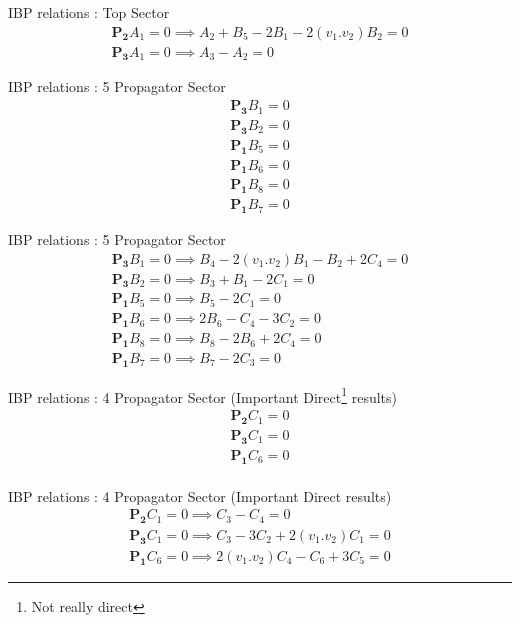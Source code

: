 \documentclass[11pt]{beamer}
\begin{document}
\begin{frame}
	IBP relations : Top Sector
	\begin{align}
		\boldsymbol{P_2}A_1=0 \implies A_2+B_5-2B_1-2(v_1.v_2)B_2=0\\	
		\boldsymbol{P_3}A_1=0 \implies A_3-A_2=0
	\end{align}
\end{frame}
\begin{frame}
	IBP relations : 5 Propagator Sector
	\begin{align*}
		\boldsymbol{P_3}B_1=0 \\	
		\boldsymbol{P_3}B_2=0 \\
		\boldsymbol{P_1}B_5=0 \\
		\boldsymbol{P_1}B_6=0 \\
		\boldsymbol{P_1}B_8=0 \\
		\boldsymbol{P_1}B_7=0 
	\end{align*}
\end{frame}
\begin{frame}
	IBP relations : 5 Propagator Sector
	\begin{align}
		\boldsymbol{P_3}B_1=0 \implies B_4-2(v_1.v_2)B_1-B_2+2C_4=0\\	
		\boldsymbol{P_3}B_2=0 \implies B_3+B_1-2C_1=0\\
		\boldsymbol{P_1}B_5=0 \implies B_5-2C_1=0\\
		\boldsymbol{P_1}B_6=0 \implies 2B_6-C_4-3C_2=0\\
		\boldsymbol{P_1}B_8=0 \implies B_8-2B_6+2C_4=0\\
		\boldsymbol{P_1}B_7=0 \implies B_7-2C_3=0 
	\end{align}
\end{frame}
\begin{frame}
	IBP relations : 4 Propagator Sector (Important Direct\footnote{Not really direct} results)\\
	\begin{align*}
		\boldsymbol{P_2}C_1=0 \\	
		\boldsymbol{P_3}C_1=0 \\
		\boldsymbol{P_1}C_6=0 \\
	\end{align*}
\end{frame}
\begin{frame}
	IBP relations : 4 Propagator Sector (Important Direct results)\\
	\begin{align*}
		\boldsymbol{P_2}C_1=0 \implies C_3-C_4=0\\	
		\boldsymbol{P_3}C_1=0 \implies C_3-3C_2+2(v_1.v_2)C_1=0\\
		\boldsymbol{P_1}C_6=0 \implies 2(v_1.v_2)C_4-C_6+3C_5=0
	\end{align*}
\end{frame}
\end{document}
